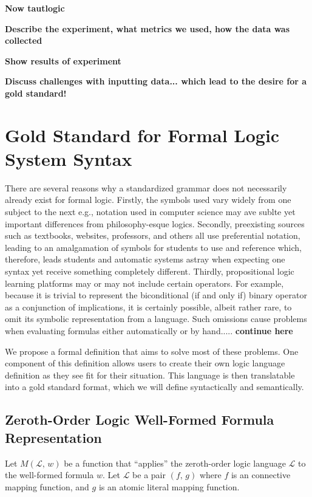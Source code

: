 \documentclass[ms]{uncgdissertationexp2}
\theoremstyle{plain}
\theoremstyle{definition}
\theoremstyle{remark}
\begin{document}
    \textbf{Now tautlogic}

    \textbf{Describe the experiment, what metrics we used, how the data was collected}

    \textbf{Show results of experiment}

    \textbf{Discuss challenges with inputting data... which lead to the desire for a gold standard!}
    
    \section{Gold Standard for Formal Logic System Syntax}
    There are several reasons why a standardized grammar does not necessarily already exist for formal logic. Firstly, the symbols used vary widely from one subject to the next e.g., notation used in computer science may ave sublte yet important differences from philosophy-esque logics. Secondly, preexisting sources such as textbooks, websites, professors, and others all use preferential notation, leading to an amalgamation of symbols for students to use and reference which, therefore, leads students and automatic systems astray when expecting one syntax yet receive something completely different. Thirdly, propositional logic learning platforms may or may not include certain operators. For example, because it is trivial to represent the biconditional (if and only if) binary operator as a conjunction of implications, it is certainly possible, albeit rather rare, to omit its symbolic representation from a language. Such omissions cause problems when evaluating formulas either automatically or by hand..... \textbf{continue here}

    We propose a formal definition that aims to solve most of these problems. One component of this definition allows users to create their own logic language definition as they see fit for their situation. This language is then translatable into a gold standard format, which we will define syntactically and semantically.

    \subsection{Zeroth-Order Logic Well-Formed Formula Representation}
    Let $M(\mathcal{L},\,w)$ be a function that ``applies'' the zeroth-order logic language $\mathcal{L}$ to the well-formed formula $w$. Let $\mathcal{L}$ be a pair $(f,\,g)$ where $f$ is an connective mapping function, and $g$ is an atomic literal mapping function. 
\end{document}
